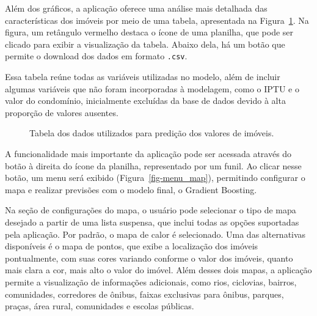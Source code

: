 \documentclass[
  12pt,
  a4paper,
]{scrreprt}
\begin{document}
\vspace{12pt}

Além dos gráficos, a aplicação oferece uma análise mais detalhada das
características dos imóveis por meio de uma tabela, apresentada na
Figura~\ref{fig-table_app}. Na figura, um retângulo vermelho destaca o
ícone de uma planilha, que pode ser clicado para exibir a visualização
da tabela. Abaixo dela, há um botão que permite o download dos dados em
formato \texttt{.csv}.

\vspace{12pt}

Essa tabela reúne todas as variáveis utilizadas no modelo, além de
incluir algumas variáveis que não foram incorporadas à modelagem, como o
IPTU e o valor do condomínio, inicialmente excluídas da base de dados
devido à alta proporção de valores ausentes.

\begin{figure}


\caption{\label{fig-table_app}Tabela dos dados utilizados para predição
dos valores de imóveis.}

\end{figure}%

A funcionalidade mais importante da aplicação pode ser acessada através
do botão à direita do ícone da planilha, representado por um funil. Ao
clicar nesse botão, um menu será exibido (Figura~\ref{fig-menu_map}),
permitindo configurar o mapa e realizar previsões com o modelo final, o
Gradient Boosting.

\vspace{12pt}

Na seção de configurações do mapa, o usuário pode selecionar o tipo de
mapa desejado a partir de uma lista suspensa, que inclui todas as opções
suportadas pela aplicação. Por padrão, o mapa de calor é selecionado.
Uma das alternativas disponíveis é o mapa de pontos, que exibe a
localização dos imóveis pontualmente, com suas cores variando conforme o
valor dos imóveis, quanto mais clara a cor, mais alto o valor do imóvel.
Além desses dois mapas, a aplicação permite a visualização de
informações adicionais, como rios, ciclovias, bairros, comunidades,
corredores de ônibus, faixas exclusivas para ônibus, parques, praças,
área rural, comunidades e escolas públicas.
\end{document}
